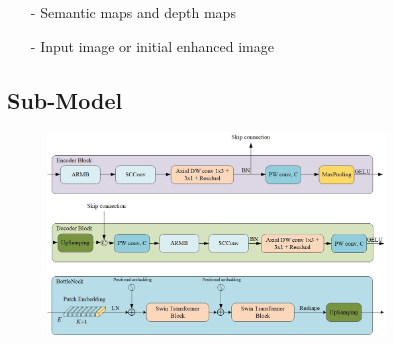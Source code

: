 \documentclass[CJK,aspectratio=169]{beamer}  %
\begin{document}
\begin{frame}
\begin{minipage}{.45\textwidth}
\begin{itemize}
				\item [-] Semantic maps and depth maps
				
				\item [-] Input image or initial enhanced image
				
			\end{itemize}
		\end{minipage}
	\end{frame}
	
	\subsection{Sub-Model}
	
	\begin{frame}
		
		\begin{figure}[htbp]
			\begin{center}
				\includegraphics[width=0.8\textwidth]{picture/LLIE/My Architecture/Encoder_Decoder}
			\end{center}
		\end{figure}

	\end{frame}
	
\end{document}
